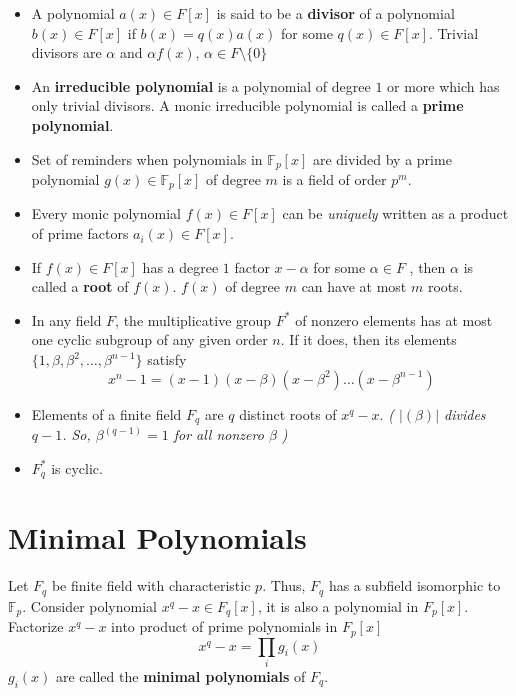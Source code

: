 \documentclass[a4paper]{article}
\theoremstyle{dotless}
\theoremstyle{dotless}
\theoremstyle{remark}
\begin{document}
\begin{itemize}
\item A polynomial $a(x) \in F[x]$ is said to be a \textbf{divisor} of a polynomial $b(x) \in F[x]$ if $b(x) = q(x)a(x)$ for some $q(x) \in F[x]$. Trivial divisors are $\alpha$ and $\alpha f(x)$, $\alpha \in  F \setminus \{0\}$

\item An \textbf{irreducible polynomial} is a polynomial of degree $1$ or more which has only trivial divisors. A monic irreducible polynomial is called a \textbf{prime polynomial}.

\item Set of reminders when polynomials in $\mathbb{F}_p[x]$ are divided by a prime polynomial $g(x) \in \mathbb{F}_p[x]$ of degree $m$ is a field of order $p^m$.

\item Every monic polynomial $f(x) \in F[x]$ can be \emph{uniquely} written as a product of prime factors $a_i(x) \in F[x]$. 

\item If $f(x) \in F[x]$ has a degree $1$ factor $x - \alpha$ for some $\alpha \in F$ , then $\alpha$ is called a \textbf{root} of $f(x)$. $f(x)$ of degree $m$ can have at most $m$ roots.

\item In any field $F$, the multiplicative group $F^*$ of nonzero elements has at most one cyclic subgroup of any given order $n$. If it does, then its elements $\{ 1,\beta, \beta^2, \dots, \beta^{n-1}\}$ satisfy $$x^n-1 = (x-1)(x-\beta)(x-\beta^2)\dots(x-\beta^{n-1})$$

\item Elements of a finite field $F_q$ are $q$ distinct roots of $x^q-x$. \textsl{( $|(\beta)|$ divides $q-1$. So, $\beta^{(q-1)} = 1$ for all nonzero $\beta $ )}

\item $F_q^*$ is cyclic.
\end{itemize}

\section{Minimal Polynomials}
Let $F_q$ be finite field with characteristic $p$. Thus, $F_q$ has a subfield isomorphic to $\mathbb{F}_p$. 
Consider polynomial $x^q - x \in F_q[x]$, it is also a polynomial in $F_p[x]$. Factorize $x^q - x$ into product of prime polynomials in $F_p[x]$
\[ x^q - x = \prod_i g_i(x) \]
$g_i(x)$ are called the \textbf{minimal polynomials} of $F_q$.
\end{document}
